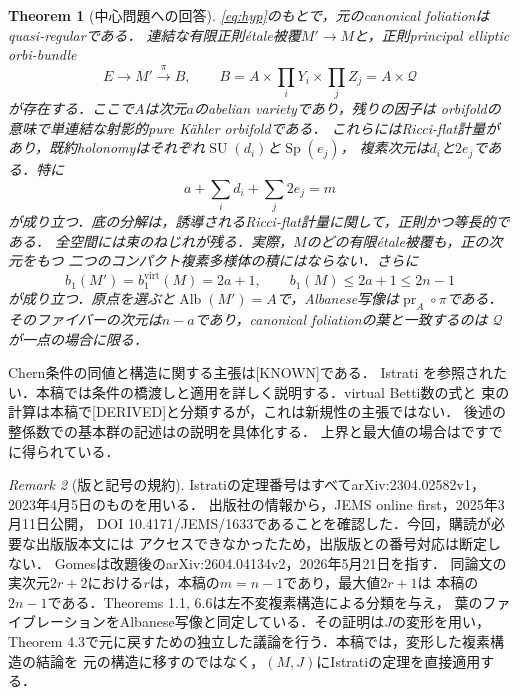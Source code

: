 \documentclass[12pt]{amsart}
\newtheorem{thm}{Theorem}[section]
\theoremstyle{definition}
\theoremstyle{remark}
\newtheorem{rem}[thm]{Remark}
\numberwithin{equation}{section}
\DeclareMathOperator{\pr}{pr}
\DeclareMathOperator{\Alb}{Alb}
\newcommand{\virt}{\mathrm{virt}}
\newcommand{\SU}{\operatorname{SU}}
\newcommand{\Sp}{\operatorname{Sp}}
\newcommand{\AIstatus}[1]{\textnormal{\textsf{[#1]}}}
\newcommand{\Qfac}{\mathcal{Q}}
\begin{document}
\begin{thm}[中心問題への回答]\label{thm:main}
\eqref{eq:hyp}のもとで，元のcanonical foliationはquasi-regularである．
連結な有限正則\emph{\'etale}被覆$M'\to M$と，正則principal elliptic orbi-bundle
\begin{equation}\label{eq:BB}
E\longrightarrow M'\xrightarrow{\pi}B,
\qquad B=A\times\prod_i Y_i\times\prod_j Z_j=A\times\Qfac
\end{equation}
が存在する．ここで$A$は次元$a$のabelian varietyであり，残りの因子は
\emph{orbifoldの意味で}単連結な射影的pure K\"ahler orbifoldである．
これらにはRicci-flat計量があり，既約holonomyはそれぞれ$\SU(d_i)$と$\Sp(e_j)$，
複素次元は$d_i$と$2e_j$である．特に
\begin{equation}\label{eq:dimension}
a+\sum_i d_i+\sum_j2e_j=m
\end{equation}
が成り立つ．底の分解は，誘導されるRicci-flat計量に関して，正則かつ等長的である．
全空間には束のねじれが残る．実際，$M$のどの有限\'etale被覆も，正の次元をもつ
二つのコンパクト複素多様体の積にはならない．さらに
\begin{equation}\label{eq:mainBetti}
b_1(M')=b_1^{\virt}(M)=2a+1,
\qquad b_1(M)\leq2a+1\leq2n-1
\end{equation}
が成り立つ．原点を選ぶと$\Alb(M')=A$で，Albanese写像は$\pr_A\circ\pi$である．
そのファイバーの次元は$n-a$であり，canonical foliationの葉と一致するのは
$\Qfac$が一点の場合に限る．
\end{thm}

Chern条件の同値と構造に関する主張は\AIstatus{KNOWN}である．
Istrati \cite[Definition 4.1, Lemma 4.4, Corollary 5.2, Theorem 5.3]{Istrati}
を参照されたい．本稿では条件の橋渡しと適用を詳しく説明する．virtual Betti数の式と
束の計算は本稿で\AIstatus{DERIVED}と分類するが，これは新規性の主張ではない．
後述の整係数での基本群の記述は\cite[Corollary 5.10]{Istrati}の説明を具体化する．
上界と最大値の場合は\cite[Corollary 5.11]{Istrati}ですでに得られている．

\begin{rem}[版と記号の規約]\label{rem:versions}
Istratiの定理番号はすべてarXiv:2304.02582v1，2023年4月5日のものを用いる．
出版社の情報から，JEMS online first，2025年3月11日公開，
DOI 10.4171/JEMS/1633であることを確認した．今回，購読が必要な出版版本文には
アクセスできなかったため，出版版との番号対応は断定しない．
Gomesは改題後のarXiv:2604.04134v2，2026年5月21日を指す．
同論文の実次元$2r+2$における$r$は，本稿の$m=n-1$であり，最大値$2r+1$は
本稿の$2n-1$である．Theorems 1.1, 6.6は左不変複素構造による分類を与え，
葉のファイブレーションをAlbanese写像と同定している．その証明は$J$の変形を用い，
Theorem 4.3で元に戻すための独立した議論を行う．本稿では，変形した複素構造の結論を
元の構造に移すのではなく，$(M,J)$にIstratiの定理を直接適用する．
\end{rem}
\end{document}
